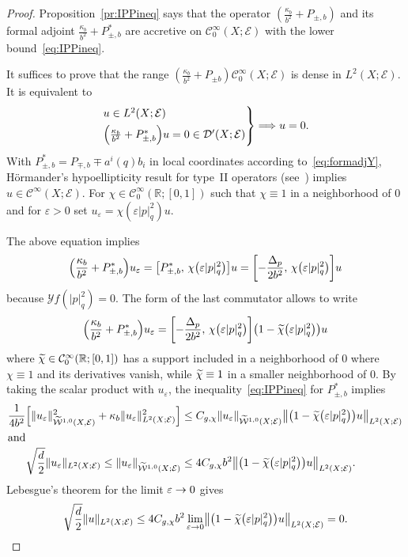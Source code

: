 \documentclass[10pt]{amsart}
\theoremstyle{definition}\newtheorem{defi}[theo]{Definition}\newtheorem{rema}[theo]{Remark}\newtheorem{exam}[theo]{Example}\newtheorem{exem}[theo]{Example}\newtheorem{nota}[theo]{Notation}
\newcommand{\R}{\mathbb{R}}
\newcommand{\clW}{\mathcal{W}}
\newcommand{\clC}{\mathcal{C}}
\newcommand{\clY}{\mathcal{Y}}
\newcommand{\clE}{\mathcal{E}}
\newcommand{\clD}{\mathcal{D}}
\let\oldtilde\tilde
\renewcommand*{\tilde}[1]{\mathchoice{\widetilde{#1}}{\widetilde{#1}}{\oldtilde{#1}}{\oldtilde{#1}}}
\let\originalleft\left
\let\originalright\right
\renewcommand{\left}{\mathopen{}\mathclose\bgroup\originalleft}
\renewcommand{\right}{\aftergroup\egroup\originalright}
\renewcommand*{\to}{\mathchoice{\longrightarrow}{\rightarrow}{\rightarrow}{\rightarrow}}
\renewcommand*{\implies}{\mathchoice{\Longrightarrow}{\Rightarrow}{\Rightarrow}{\Rightarrow}}
\begin{document}
\begin{proof}
Proposition~\ref{pr:IPPineq} says that the operator $(\frac{\kappa_{b}}{b^{2}}+P_{\pm, b})$ and its formal adjoint $\frac{\kappa_{b}}{b^{2}}+P_{\pm,b}^{*}$ are accretive on $\clC^{\infty}_{0}(X;\clE)$ with the lower bound~\eqref{eq:IPPineq}.

It suffices to prove that the range $(\frac{\kappa_{b}}{b^{2}}+P_{\pm b})\clC^{\infty}_{0}(X;\clE)$ is dense in $L^{2}(X;\clE)$. It is equivalent to
\[
\begin{rcases}
u\in L^{2}(X;\clE)\\
\left(\frac{\kappa_{b}}{b^{2}}+P_{\pm, b}^{*}\right)u=0\in \clD'(X;\clE)
\end{rcases}
\implies u=0.
\]
With $P_{\pm,b}^{*}=P_{\mp,b}\mp a^{i}(q)b_{i}$ in local coordinates according to~\eqref{eq:formadjY}, H\"ormander's hypoellipticity result for type~II operators (see~\cite{Hor67}) implies $u\in \clC^{\infty}(X;\clE)$. For $\chi\in \clC^{\infty}_{0}(\R;[0,1])$ such that $\chi\equiv 1$ in a neighborhood of $0$ and for $\varepsilon>0$ set $u_{\varepsilon}=\chi(\varepsilon|p|_{q}^{2})u$.

The above equation implies
\[
\left(\frac{\kappa_{b}}{b^{2}}+P_{\pm,b}^{*}\right)u_{\varepsilon}=\left[P_{\pm, b}^{*},\,\chi\left(\varepsilon |p|_{q}^{2}\right)\right]u = \left[-\frac{\Delta_{p}}{2b^{2}},\,\chi\left(\varepsilon|p|_{q}^{2}\right)\right]u
\]
because $\clY f(|p|_{q}^{2})=0$. The form of the last commutator allows to write
\[
\left(\frac{\kappa_{b}}{b^{2}}+P_{\pm,b}^{*}\right)u_{\varepsilon}= \left[-\frac{\Delta_{p}}{2b^{2}},\,\chi\left(\varepsilon|p|_{q}^{2}\right)\right]\left(1-\tilde{\chi}\left(\varepsilon |p|_{q}^{2}\right)\right)u
\]
where $\tilde{\chi}\in \clC^{\infty}_{0}(\R;[0,1])$ has a support included in a neighborhood of $0$ where $\chi\equiv 1$ and its derivatives vanish, while $\tilde{\chi}\equiv 1$ in a smaller neighborhood of $0$. By taking the scalar product with $u_{\varepsilon}$, the inequality~\eqref{eq:IPPineq} for $P_{\pm,b}^{*}$ implies
\begin{align*}
\frac{1}{4b^{2}}\left[\|u_{\varepsilon}\|_{\widetilde{\clW}^{1,0}(X,\clE)}^{2}+\kappa_{b}\|u_{\varepsilon}\|^{2}_{L^{2}(X;\clE)}\right] &\leq C_{g,\chi}\|u_{\varepsilon}\|_{\widetilde{\clW}^{1,0}(X;\clE)}\left\|\left(1-\tilde{\chi}\left(\varepsilon|p|_{q}^{2}\right)\right)u\right\|_{L^{2}(X;\clE)}
\\
\intertext{and}
\sqrt{\frac{d}{2}}\|u_{\varepsilon}\|_{L^{2}(X;\clE)}\leq \|u_{\varepsilon}\|_{\widetilde{\clW}^{1,0}(X;\clE)} &\leq 4C_{g,\chi}b^{2}\left\|\left(1-\tilde{\chi}\left(\varepsilon|p|_{q}^{2}\right)\right)u\right\|_{L^{2}(X;\clE)}.
\end{align*}
Lebesgue's theorem for the limit $\varepsilon\to 0$ gives
\[
\sqrt{\frac{d}{2}}\|u\|_{L^{2}(X;\clE)}\leq 4C_{g,\chi}b^{2}\lim_{\varepsilon\to 0}
\left\|\left(1-\tilde{\chi}\left(\varepsilon|p|_{q}^{2}\right)\right)u\right\|_{L^{2}(X;\clE)}=0.\qedhere
\]
\end{proof}
\end{document}

